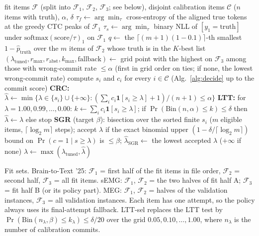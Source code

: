 \begin{algorithm}[H]
\caption{Fitting and calibration of the commit threshold}
\label{alg:calibrate}
\small
\begin{algorithmic}[1]
\Require fit items $\mathcal{F}$ (split into $\mathcal{F}_1$, $\mathcal{F}_2$, $\mathcal{F}_3$; see below), disjoint calibration items $\mathcal{C}$ ($n$ items with truth), $\alpha$, $\delta$
\State $\tau_f \gets \arg\min_\tau$ cross-entropy of the aligned true tokens at the greedy CTC peaks of $\mathcal{F}_1$ 
\State $\tau_s \gets \arg\min_\tau$ binary NLL of $[y_1 = \text{truth}]$ under $\mathrm{softmax}(\text{score}/\tau)_1$ on $\mathcal{F}_1$
\State $q \gets$ the $\lceil (m+1)(1 - 0.1)\rceil$-th smallest $1 - \hat p_{\text{truth}}$ over the $m$ items of $\mathcal{F}_2$ whose truth is in the $K$-best list
\State $(\lambda_{\mathrm{tuned}}, r_{\max}, r_{\mathrm{abst}}, k_{\max}, \text{fallback}) \gets$ grid point with the highest \ewpm{} on $\mathcal{F}_3$ among those with wrong-commit rate $\le \alpha$ (first in grid order on ties; if none, the lowest wrong-commit rate)
\State compute $s_i$ and $c_i$ for every $i \in \mathcal{C}$ (Alg.~\ref{alg:decide} up to the commit score)
\State \textbf{CRC:} $\hat\lambda \gets \min\{\lambda \in \{s_i\} \cup \{+\infty\} : (\sum_i c_i \mathbf{1}[s_i \ge \lambda] + 1)/(n+1) \le \alpha\}$
\State \textbf{LTT:} for $\lambda = 1.00, 0.99, \ldots, 0.00$: $k \gets \sum_i c_i \mathbf{1}[s_i \ge \lambda]$; if $\Pr(\mathrm{Bin}(n,\alpha) \le k) \le \delta$ then $\hat\lambda \gets \lambda$ else stop 
\State \textbf{SGR} (target $\beta$): bisection over the sorted finite $s_i$ ($m$ eligible items, $\lceil\log_2 m\rceil$ steps); accept $\lambda$ if the exact binomial upper $(1 - \delta/\lceil\log_2 m\rceil)$ bound on $\Pr(c = 1 \mid s \ge \lambda)$ is $\le \beta$; $\hat\lambda_{\mathrm{SGR}} \gets$ the lowest accepted $\lambda$ ($+\infty$ if none)
\State \Return $\lambda \gets \max(\lambda_{\mathrm{tuned}}, \hat\lambda)$ 
\end{algorithmic}
\end{algorithm}

\noindent Fit sets. Brain-to-Text '25: $\mathcal{F}_1$ = first half of the fit items in file order, $\mathcal{F}_2$ = second half, $\mathcal{F}_3$ = all fit items. sEMG: $\mathcal{F}_1$, $\mathcal{F}_2$ = the two halves of fit half A; $\mathcal{F}_3$ = fit half B (or its policy part). MEG: $\mathcal{F}_1$, $\mathcal{F}_2$ = halves of the validation instances, $\mathcal{F}_3$ = all validation instances. Each item has one attempt, so the policy always uses its final-attempt fallback. LTT-sel replaces the LTT test by $\Pr(\mathrm{Bin}(n_\lambda, \beta) \le k_\lambda) \le \delta/20$ over the grid $0.05, 0.10, \ldots, 1.00$, where $n_\lambda$ is the number of calibration commits.

